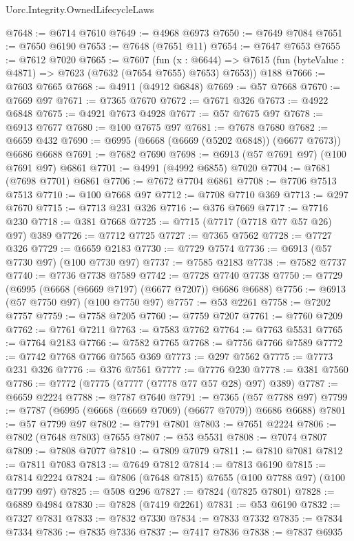 \begin{lexlean}{Uorc.Integrity.OwnedLifecycleLaws}
\begin{coremodule}
@7648 := @6714 @7610
@7649 := @4968 @6973
@7650 := @7649 @7084
@7651 := @7650 @6190
@7653 := @7648 (@7651 @11)
@7654 := @7647 @7653
@7655 := @7612 @7020
@7665 := @7607
    (fun (x : @6644) => @7615 (fun (byteValue : @4871) => @7623 (@7632 (@7654 @7655) @7653) @7653))
    @188
@7666 := @7603 @7665
@7668 := @4911 (@4912 @6848)
@7669 := @57 @7668
@7670 := @7669 @97
@7671 := @7365 @7670
@7672 := @7671 @326
@7673 := @4922 @6848
@7675 := @4921 @7673 @4928
@7677 := @57 @7675 @97
@7678 := @6913 @7677
@7680 := @100 @7675 @97
@7681 := @7678 @7680
@7682 := @6659 @432
@7690 := @6995 (@6668 (@6669 (@5202 @6848)) (@6677 @7673)) @6686 @6688
@7691 := @7682 @7690
@7698 := @6913 (@57 @7691 @97) (@100 @7691 @97) @6861
@7701 := @4991 (@4992 @6855) @7020
@7704 := @7681 (@7698 @7701) @6861
@7706 := @7672 @7704 @6861
@7708 := @7706 @7513 @7513
@7710 := @100 @7668 @97
@7712 := @7708 @7710 @369
@7713 := @297 @7670
@7715 := @7713 @231 @326
@7716 := @376 @7669
@7717 := @7716 @230
@7718 := @381 @7668
@7725 := @7715 (@7717 (@7718 @77 @57 @26) @97) @389
@7726 := @7712 @7725
@7727 := @7365 @7562
@7728 := @7727 @326
@7729 := @6659 @2183
@7730 := @7729 @7574
@7736 := @6913 (@57 @7730 @97) (@100 @7730 @97)
@7737 := @7585 @2183
@7738 := @7582 @7737
@7740 := @7736 @7738 @7589
@7742 := @7728 @7740 @7738
@7750 := @7729 (@6995 (@6668 (@6669 @7197) (@6677 @7207)) @6686 @6688)
@7756 := @6913 (@57 @7750 @97) (@100 @7750 @97)
@7757 := @53 @2261
@7758 := @7202 @7757
@7759 := @7758 @7205
@7760 := @7759 @7207
@7761 := @7760 @7209
@7762 := @7761 @7211
@7763 := @7583 @7762
@7764 := @7763 @5531
@7765 := @7764 @2183
@7766 := @7582 @7765
@7768 := @7756 @7766 @7589
@7772 := @7742 @7768 @7766 @7565 @369
@7773 := @297 @7562
@7775 := @7773 @231 @326
@7776 := @376 @7561
@7777 := @7776 @230
@7778 := @381 @7560
@7786 := @7772 (@7775 (@7777 (@7778 @77 @57 @28) @97) @389)
@7787 := @6659 @2224
@7788 := @7787 @7640
@7791 := @7365 (@57 @7788 @97)
@7799 := @7787 (@6995 (@6668 (@6669 @7069) (@6677 @7079)) @6686 @6688)
@7801 := @57 @7799 @97
@7802 := @7791 @7801
@7803 := @7651 @2224
@7806 := @7802 (@7648 @7803) @7655
@7807 := @53 @5531
@7808 := @7074 @7807
@7809 := @7808 @7077
@7810 := @7809 @7079
@7811 := @7810 @7081
@7812 := @7811 @7083
@7813 := @7649 @7812
@7814 := @7813 @6190
@7815 := @7814 @2224
@7824 := @7806 (@7648 @7815) @7655 (@100 @7788 @97) (@100 @7799 @97)
@7825 := @508 @296
@7827 := @7824 (@7825 @7801)
@7828 := @6889 @4984
@7830 := @7828 (@7419 @2261)
@7831 := @53 @6190
@7832 := @7327 @7831
@7833 := @7832 @7330
@7834 := @7833 @7332
@7835 := @7834 @7334
@7836 := @7835 @7336
@7837 := @7417 @7836
@7838 := @7837 @6935

\end{coremodule}
\end{lexlean}

